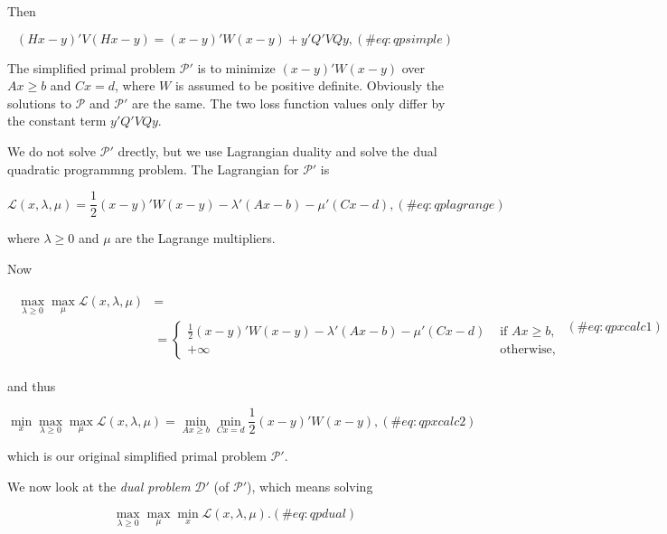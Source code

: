 \documentclass[
  12pt,
  letterpaper,
  DIV=11,
  numbers=noendperiod]{scrreprt}
\theoremstyle{remark}
\begin{document}
Then

\begin{equation}
(Hx-y)'V(Hx-y)=(x-y)'W(x-y)+y'Q'VQy,
(\#eq:qpsimple)
\end{equation}

The simplified primal problem \(\mathcal{P}'\) is to minimize
\((x-y)'W(x-y)\) over \(Ax\geq b\) and \(Cx=d\), where \(W\) is assumed
to be positive definite. Obviously the solutions to \(\mathcal{P}\) and
\(\mathcal{P}'\) are the same. The two loss function values only differ
by the constant term \(y'Q'VQy\).

We do not solve \(\mathcal{P}'\) drectly, but we use Lagrangian duality
and solve the dual quadratic programmng problem. The Lagrangian for
\(\mathcal{P}'\) is

\begin{equation}
\mathcal{L}(x,\lambda,\mu)=\frac12(x-y)'W(x-y)-
\lambda'(Ax - b)-\mu'(Cx-d),
(\#eq:qplagrange)
\end{equation}

where \(\lambda\geq 0\) and \(\mu\) are the Lagrange multipliers.

Now

\begin{align}
\begin{split}
\max_{\lambda\geq 0}\max_\mu\mathcal{L}(x,\lambda,\mu)&=\\
&=\begin{cases}\frac12(x-y)'W(x-y)-\lambda'(Ax - b)-\mu'(Cx-d)&\text{ if }Ax\geq b,\\
+\infty&\text{ otherwise},
\end{cases}
\end{split}
(\#eq:qpxcalc1)
\end{align}

and thus

\begin{equation}
\min_x\max_{\lambda\geq 0}\max_\mu\mathcal{L}(x,\lambda,\mu)=\min_{Ax\geq b}\min_{Cx=d}\frac12(x-y)'W(x-y),
(\#eq:qpxcalc2)
\end{equation}

which is our original simplified primal problem \(\mathcal{P}'\).

We now look at the \emph{dual problem} \(\mathcal{D}'\) (of
\(\mathcal{P}'\)), which means solving

\begin{equation}
\max_{\lambda\geq 0}\max_\mu\min_x\mathcal{L}(x,\lambda,\mu).
(\#eq:qpdual)
\end{equation}
\end{document}
